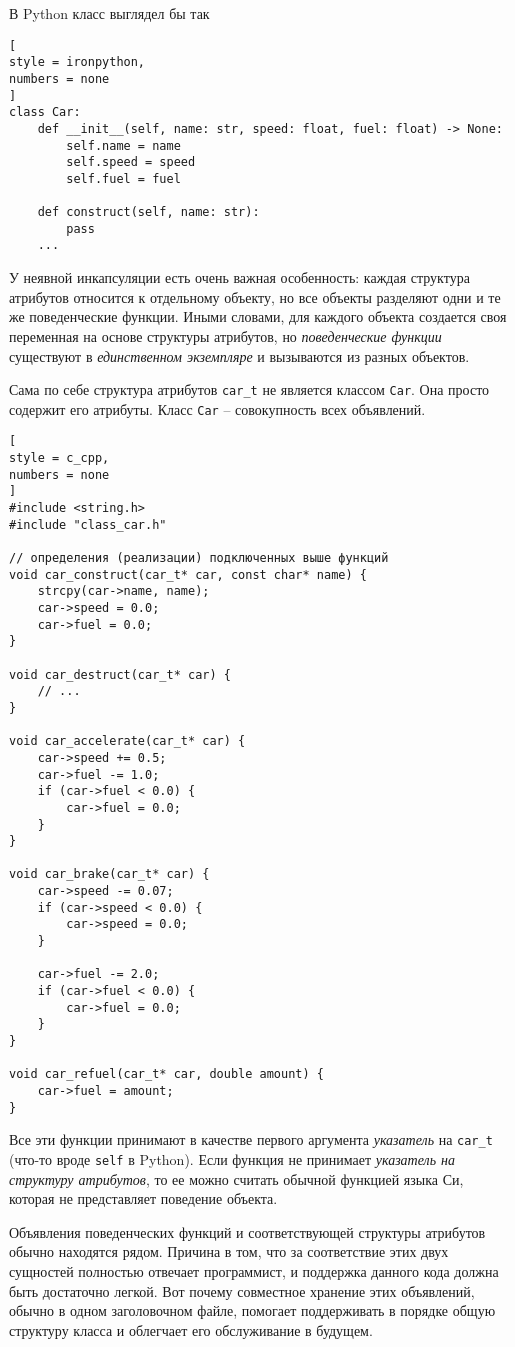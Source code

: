 \documentclass[%
	11pt,
	a4paper,
	utf8,
		]{article}
\begin{document}
В Python класс выглядел бы так
\begin{lstlisting}[
style = ironpython,
numbers = none
]
class Car:
    def __init__(self, name: str, speed: float, fuel: float) -> None:
        self.name = name
        self.speed = speed
        self.fuel = fuel
        
    def construct(self, name: str):
        pass
    ...
\end{lstlisting}

У неявной инкапсуляции есть очень важная особенность: каждая структура атрибутов относится к отдельному объекту, но все объекты разделяют одни и те же поведенческие функции. Иными словами, для каждого объекта создается своя переменная на основе структуры атрибутов, но \emph{поведенческие функции} существуют в \emph{единственном экземпляре} и вызываются из разных объектов.

Сама по себе структура атрибутов \verb|car_t| не является классом \verb|Car|. Она просто содержит его атрибуты. Класс \verb|Car| -- совокупность всех объявлений.
\begin{lstlisting}[
style = c_cpp,
numbers = none
]
#include <string.h>
#include "class_car.h"

// определения (реализации) подключенных выше функций
void car_construct(car_t* car, const char* name) {
    strcpy(car->name, name);
    car->speed = 0.0;
    car->fuel = 0.0;
}

void car_destruct(car_t* car) {
    // ...
}

void car_accelerate(car_t* car) {
    car->speed += 0.5;
    car->fuel -= 1.0;
    if (car->fuel < 0.0) {
        car->fuel = 0.0;
    }
}
    
void car_brake(car_t* car) {
    car->speed -= 0.07;
    if (car->speed < 0.0) {
        car->speed = 0.0;
    }
    
    car->fuel -= 2.0;
    if (car->fuel < 0.0) {
        car->fuel = 0.0;
    }
}

void car_refuel(car_t* car, double amount) {
    car->fuel = amount;
}
\end{lstlisting}

Все эти функции принимают в качестве первого аргумента \emph{указатель} на \verb|car_t| (что-то вроде \verb|self| в Python). Если функция не принимает \emph{указатель на структуру атрибутов}, то ее можно считать обычной функцией языка Си, которая не представляет поведение объекта.

Объявления поведенческих функций и соответствующей структуры атрибутов обычно находятся рядом. Причина в том, что за соответствие этих двух сущностей полностью отвечает программист, и поддержка данного кода должна быть достаточно легкой. Вот почему совместное хранение этих объявлений, обычно в одном заголовочном файле, помогает поддерживать в порядке общую структуру класса и облегчает его обслуживание в будущем. 
\end{document}
